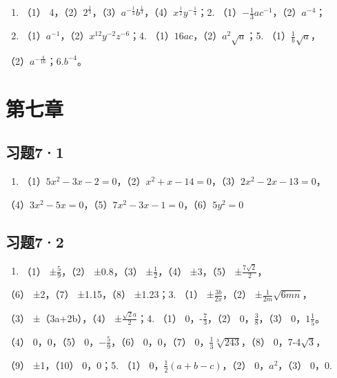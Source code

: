 \begin{enumerate}
\item
  （1）
  4，（2）\(2^{\frac{1}{3}}\)，（3）\(a^{-\frac{1}{3}}b^{\frac{1}{3}}\)，（4）\(x^{\frac{1}{2}}y^{-\frac{1}{4}}\)；2.
  （1）\(-\frac{1}{3}ac^{-1}\)，（2）\(a^{-4}\)；
\item
  （1）\(a^{-1}\)，（2）\(x^{12}y^{-2}z^{-6}\)；4.
  （1）\(16ac\)，（2）\(a^2\sqrt{a}\)；5. （1）\(\frac{1}{b}\sqrt{a}\)，
\end{enumerate}

（2）\(a^{-\frac{4}{16}}\)；6.\(b^{-4}\)。

\section{第七章}

\subsection{习题7·1}

\begin{enumerate}
\item
  （1）\(5x^{2} - 3x - 2 = 0\)，（2）\(x^{2} + x - 14 = 0\)，（3）\(2x^{2} - 2x - 13 = 0\)，
\end{enumerate}

（4）\(3x^{2} - 5x = 0\)，（5）\(7x^{2} - 3x - 1 = 0\)，（6）\(5y^{2} = 0\)

\subsection{习题7·2}

\begin{enumerate}[start=2]
\item
  （1） ±\(\frac{5}{9}\)，（2） ±0.8，（3） ±\(\frac{1}{2}\)，（4）
  ±3，（5） ±\(\frac{7\sqrt{2}}{2}\)，
\end{enumerate}

（6） ±2，（7） ±1.15，（8） ±1.23；3. （1） ±\(\frac{3b}{2x}\)，（2）
±\(\frac{1}{2m}\sqrt{6mn}\)，

（3） ±（3a+2b），（4） ±\(\frac{\sqrt{2}a}{2}\)；4. （1）
0，-\(\frac{7}{3}\)，（2） 0，\(\frac{3}{8}\)，（3）
0，\(1\frac{1}{5}\)。

（4） 0，0，（5） 0，\(-\frac{5}{9}\)，（6） 0，0，（7）
0，\(\frac{1}{3}\sqrt[3]{243}\)，（8） 0，7-4\(\sqrt{3}\)，

（9） ±1，（10） 0，0；5. （1） 0，\(\frac{1}{2}(a + b - c)\)，（2）
0，\(a^2\)，（3） 0，0.

